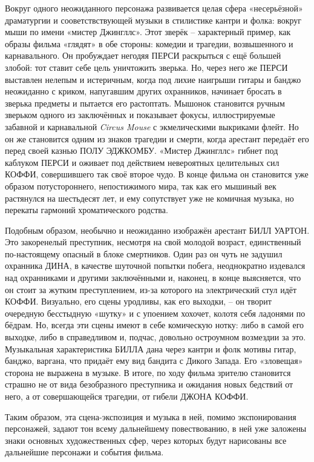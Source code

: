 Вокруг одного неожиданного персонажа развивается целая сфера «несерьёзной» драматургии и сооветствствующей музыки в стилистике кантри и фолка: вокруг мыши по имени «мистер Джингллс».
Этот зверёк -- характерный пример, как образы фильма «глядят» в обе стороны: комедии и трагедии, возвышенного и карнавального.
Он пробуждает негодяя ПЕРСИ раскрыться с ещё большей злобой: тот ставит себе цель уничтожить зверька.
Но, через него же ПЕРСИ выставлен нелепым и истеричным, когда под лихие наигрыши гитары и банджо неожиданно с криком, напугавшим других охранников, начинает бросать в зверька предметы и пытается его растоптать.
Мышонок становится ручным зверьком одного из заключённых и показывает фокусы, иллюстрируемые забавной и карнавальной \emph{Circus Mouse} с экмелическими выкриками флейт.
Но он же становится одним из знаков трагедии и смерти, когда арестант передаёт его перед своей казнью ПОЛУ ЭДЖКОМБУ.
«Мистер Джингллс» гибнет под каблуком ПЕРСИ и оживает под действием невероятных целительных сил КОФФИ, совершившего так своё второе чудо.
В конце фильма он становится уже образом потустороннего, непостижимого мира, так как его мышиный век растянулся на шестьдесят лет, и ему сопутствует уже не комичная музыка, но перекаты гармоний хроматического родства.

Подобным образом, необычно и неожиданно изображён арестант БИЛЛ УАРТОН.
Это закоренелый преступник, несмотря на свой молодой возраст, единственный по-настоящему опасный в блоке смертников.
Один раз он чуть не задушил охранника ДИНА, в качестве шуточной попытки побега, неоднократно издевался над охранниками и другими заключёнными и, наконец, в конце выясняется, что он стоит за жутким преступлением, из-за которого на электрический стул идёт КОФФИ.
Визуально, его сцены уродливы, как его выходки, -- он творит очередную бесстыдную «шутку» и с упоением хохочет, колотя себя ладонями по бёдрам.
Но, всегда эти сцены имеют в себе комическую нотку: либо в самой его выходке, либо в справедливом и, подчас, довольно остроумном возмездии за это.
Музыкальная характеристика БИЛЛА дана через кантри и фолк мотивы гитар, банджо, варгана, что придаёт ему вид бандита с Дикого Запада.
Его «зловещая» сторона не выражена в музыке.
В итоге, по ходу фильма зрителю становится страшно не от вида безобразного преступника и ожидания новых бедствий от него, а от совершающейся трагедии, от гибели ДЖОНА КОФФИ.

Таким образом, эта сцена-экспозиция и музыка в ней, помимо экспонирования персонажей, задают тон всему дальнейшему повествованию, в ней уже заложены знаки основных художественных сфер, через которых будут нарисованы все дальнейшие персонажи и события фильма.


